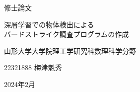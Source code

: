 \documentclass[dvipdfmx]{jsarticle}
\begin{document}
\begin{titlepage}
    \begin{center}

        {\Large 修士論文}

        \vspace{160pt}

        {\Huge 深層学習での物体検出による}\\
        {\Huge バードストライク調査プログラムの作成} 

        \vspace{160pt}

        {\LARGE 山形大学大学院理工学研究科数理科学分野}

        \vspace{10pt}

        {\LARGE 22321888 梅津魁秀}

        \vspace{80pt}

        {\Large 2024年2月}   

    \end{center}
\end{titlepage}
\end{document}
